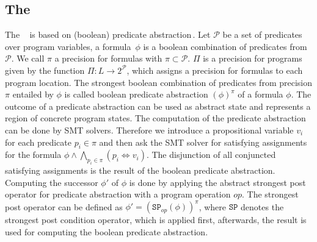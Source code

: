 \subsection{The \PredicateCPA{}}\label{title:predicatecpa}
The \PredicateCPA{}~\cite{Beyer:PredicateAbstraction} is based on (boolean) predicate abstraction\,. Let $\mathcal{P}$
be a set of predicates over program variables, a formula~$\phi$ is 
a boolean combination of predicates from $\mathcal{P}$. We call $
\pi$ a precision for formulas with $\pi \subset \mathcal{P}$. $
\Pi$ is a precision for programs given by the function $\Pi: L 
\rightarrow 2^\mathcal{P}$, which assigns a precision for formulas 
to each program location. The strongest boolean combination of 
predicates from precision $\pi$ entailed by $\phi$ is called 
boolean predicate abstraction $(\phi)^\pi$ of a formula $\phi$.
The outcome of a predicate abstraction can be used as abstract 
state and represents a region of concrete program states. The 
computation of the predicate abstraction can be done by \ac{SMT} 
solvers. Therefore we introduce a propositional variable 
$v_i$ for each predicate $p_i \in \pi$ and 
then ask the \ac{SMT} solver for satisfying assignments for the formula $\phi \land 
\bigwedge_{p_i \in \pi}(p_i \iff v_i)$. The disjunction of all 
conjuncted satisfying assignments is the result of the boolean 
predicate abstraction. Computing the successor $\phi'$ of $\phi$ is done by applying the abstract
strongest post operator for predicate abstraction with a program operation $op$. The strongest
post operator can be defined as $\phi' = (\mathtt{SP}_{op}(\phi))^\pi$, where $\mathtt{SP}$ denotes
the strongest post condition operator, which is applied first, afterwards, the result is used for
computing the boolean predicate abstraction.

